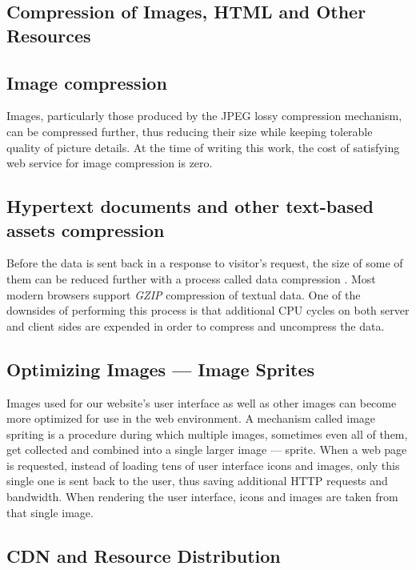 \subsection{Compression of Images, HTML and Other Resources}

\subsection*{Image compression}

Images, particularly those produced by the JPEG lossy compression mechanism, can be compressed further, thus reducing their size while keeping tolerable quality of picture details. At the time of writing this work, the cost of satisfying web service \cite{Service:Smushit} for image compression is zero.


\subsection*{Hypertext documents and other text-based assets compression}

Before the data is sent back in a response to visitor’s request, the size of some of them can be reduced further with a process called data compression \cite{Study:Google-compression}. Most modern browsers \cite{Study:SO-gzip-browser-support} support \emph{GZIP} compression of textual data. One of the downsides of performing this process is that additional CPU cycles on both server and client sides are expended in order to compress and uncompress the data.

\subsection{Optimizing Images — Image Sprites}

Images used for our website's user interface as well as other images can become more optimized for use in the web environment. A mechanism called image spriting \cite{Study:CSSwizardy-image-spriting} is a procedure during which multiple images, sometimes even all of them, get collected and combined into a single larger image — sprite. When a web page is requested, instead of loading tens of user interface icons and images, only this single one is sent back to the user, thus saving additional HTTP requests and bandwidth. When rendering the user interface, icons and images are taken from that single image.

\subsection{CDN and Resource Distribution}

